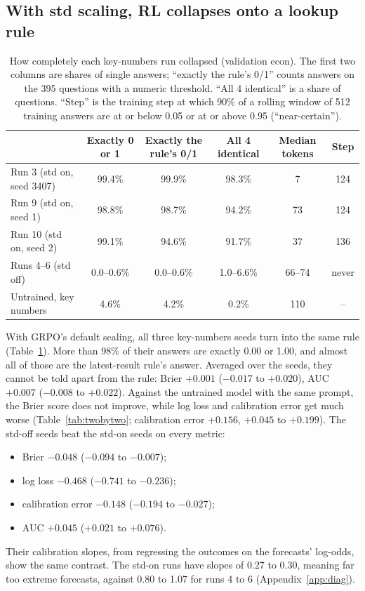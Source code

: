 \documentclass[11pt]{article}
\begin{document}
\subsection{With std scaling, RL collapses onto a lookup rule}
\label{sec:collapse}

\begin{table}[t]
\centering\small
\caption{How completely each key-numbers run collapsed (validation econ). The first two columns are shares of single answers; ``exactly the rule's 0/1'' counts answers on the 395 questions with a numeric threshold. ``All 4 identical'' is a share of questions. ``Step'' is the training step at which 90\% of a rolling window of 512 training answers are at or below 0.05 or at or above 0.95 (``near-certain'').}
\label{tab:collapse}
\setlength{\tabcolsep}{4pt}
\begin{tabular}{lccccc}
\toprule
 & Exactly 0 or 1 & Exactly the rule's 0/1 & All 4 identical & Median tokens & Step \\
\midrule
Run 3 (std on, seed 3407) & 99.4\% & 99.9\% & 98.3\% & 7 & 124 \\
Run 9 (std on, seed 1) & 98.8\% & 98.7\% & 94.2\% & 73 & 124 \\
Run 10 (std on, seed 2) & 99.1\% & 94.6\% & 91.7\% & 37 & 136 \\
Runs 4--6 (std off) & 0.0--0.6\% & 0.0--0.6\% & 1.0--6.6\% & 66--74 & never \\
Untrained, key numbers & 4.6\% & 4.2\% & 0.2\% & 110 & -- \\
\bottomrule
\end{tabular}
\end{table}

With GRPO's default scaling, all three key-numbers seeds turn into the same rule (Table~\ref{tab:collapse}). More than 98\% of their answers are exactly 0.00 or 1.00, and almost all of those are the latest-result rule's answer. Averaged over the seeds, they cannot be told apart from the rule: Brier $+0.001$ ($-0.017$ to $+0.020$), AUC $+0.007$ ($-0.008$ to $+0.022$). Against the untrained model with the same prompt, the Brier score does not improve, while log loss and calibration error get much worse (Table~\ref{tab:twobytwo}; calibration error $+0.156$, $+0.045$ to $+0.199$). The std-off seeds beat the std-on seeds on every metric:
\begin{itemize}[leftmargin=*]
\item Brier $-0.048$ ($-0.094$ to $-0.007$);
\item log loss $-0.468$ ($-0.741$ to $-0.236$);
\item calibration error $-0.148$ ($-0.194$ to $-0.027$);
\item AUC $+0.045$ ($+0.021$ to $+0.076$).
\end{itemize}
Their calibration slopes, from regressing the outcomes on the forecasts' log-odds, show the same contrast. The std-on runs have slopes of 0.27 to 0.30, meaning far too extreme forecasts, against 0.80 to 1.07 for runs 4 to 6 (Appendix~\ref{app:diag}).
\end{document}
